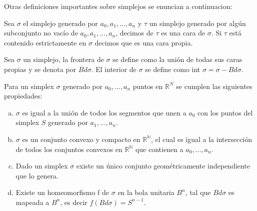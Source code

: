 %
Otras definiciones importantes sobre simplejos se enuncian a continuacion:
\begin{Defi}
Sea $\sigma$ el simplejo generado por $a_0,a_1,...,a_n$ y $\tau$ un simplejo generado por algún subconjunto no vacío de $a_0,a_1,...,a_n$, decimos de $\tau$ es una cara de $\sigma$. Si $\tau$ está contenido estrictamente en $\sigma$ decimos que es una cara propia. 
\end{Defi}
\begin{Defi}
Sea $\sigma$ un simplejo, la frontera de $\sigma$ se define como la unión de todas sus caras propias y se denota por $Bd\sigma$. El interior de $\sigma$ se define como int $\sigma = \sigma-Bd\sigma$. 
\end{Defi}
\begin{Prop}
Para un simplex $\sigma$ generado por $a_0,...,a_n$ puntos en $\mathbb{R}^{N}$ se cumplen las siguientes propiedades:
\begin{enumerate}[(a)]
\item $\sigma$ es igual a la unión de todos los segmentos que unen a $a_0$ con los puntos del simplex $S$ generado por $a_1,...,a_n$.
\item $\sigma$ es un conjunto convexo y compacto en $\mathbb{R^{N}}$, el cual es igual a la intersección de todos los conjuntos convexos en $\mathbb{R^{N}}$ que contienen a $a_0,...,a_n$.
\item Dado un simplex $\sigma$ existe un único conjunto geométricamente independiente que lo genera.
\item Existe un homeomorfismo f de $\sigma$ en la bola unitaria $B^n$, tal que $Bd\sigma$ es mapeada a $B^n$, es decir $f(Bd\sigma) = S^{n-1}$.
\end{enumerate}
\end{Prop}

